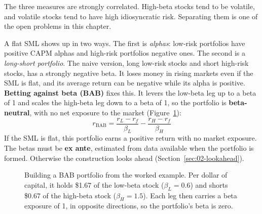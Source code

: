 The three measures are strongly correlated. High-beta stocks tend to be volatile, and volatile stocks tend to have high idiosyncratic risk. Separating them is one of the open problems in this chapter.

A flat SML shows up in two ways. The first is \emph{alphas}: low-risk portfolios have positive CAPM alphas and high-risk portfolios negative ones. The second is a \emph{long-short portfolio}. The naive version, long low-risk stocks and short high-risk stocks, has a strongly negative beta. It loses money in rising markets even if the SML is flat, and its average return can be negative while its alpha is positive. \textbf{Betting against beta (BAB)} fixes this. It levers the low-beta leg up to a beta of 1 and scales the high-beta leg down to a beta of 1, so the portfolio is \textbf{beta-neutral}, with no net exposure to the market (Figure~\ref{fig:12-bab}):
\begin{equation}
  r_{\mathrm{BAB}} = \frac{r_L - r_f}{\beta_L} - \frac{r_H - r_f}{\beta_H}
  \label{eq:12-bab}
\end{equation}
If the SML is flat, this portfolio earns a positive return with no market exposure. The betas must be \textbf{ex ante}, estimated from data available when the portfolio is formed. Otherwise the construction looks ahead (Section~\ref{sec:02-lookahead}).

\begin{figure}[htbp]
\centering
{}
\caption{Building a BAB portfolio from the worked example. Per dollar of capital, it holds \$1.67 of the low-beta stock ($\beta_L = 0.6$) and shorts \$0.67 of the high-beta stock ($\beta_H = 1.5$). Each leg then carries a beta exposure of 1, in opposite directions, so the portfolio's beta is zero.}
\label{fig:12-bab}
\end{figure}

